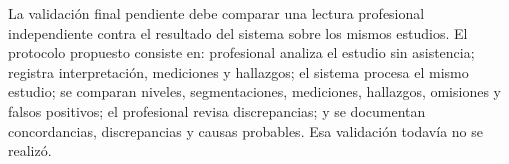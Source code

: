 La validación final pendiente debe comparar una lectura profesional independiente contra el resultado del sistema sobre los mismos estudios. El protocolo propuesto consiste en: profesional analiza el estudio sin asistencia; registra interpretación, mediciones y hallazgos; el sistema procesa el mismo estudio; se comparan niveles, segmentaciones, mediciones, hallazgos, omisiones y falsos positivos; el profesional revisa discrepancias; y se documentan concordancias, discrepancias y causas probables. Esa validación todavía no se realizó.
